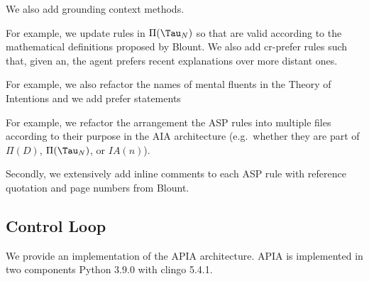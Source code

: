 We also add grounding context methods.

For example, we update rules in $\Pi(\Tau_N)$ so that are valid according to the mathematical definitions proposed by Blount.
We also add cr-prefer rules such that, given an, the agent prefers recent explanations over more distant ones.

For example, we also refactor the names of mental fluents in the Theory of Intentions and we add prefer statements

For example, we refactor the arrangement the ASP rules into multiple files according to their purpose in the AIA architecture (e.g.~whether they are part of $\Pi(D)$, $\Pi(\Tau_N)$, or $IA(n)$).

Secondly, we extensively add inline comments to each ASP rule with reference quotation and page numbers from Blount.

\subsection{Control Loop}

We provide an implementation of the APIA architecture.
APIA is implemented in two components Python 3.9.0 with clingo 5.4.1.
